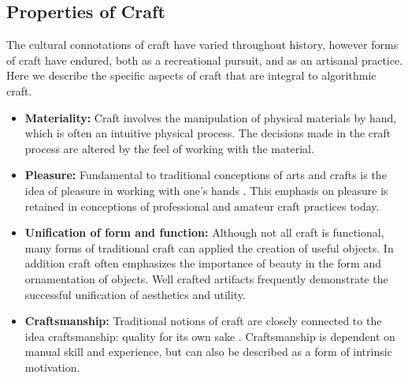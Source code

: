 \documentclass{sigchi}
\begin{document}

\subsection{Properties of Craft}
The cultural connotations of craft have varied throughout history, however forms of craft have endured, both as a recreational pursuit, and as an artisanal practice. Here we describe the specific aspects of craft that are integral to algorithmic craft.
\begin{itemize}
\item \textbf{Materiality:} Craft involves the manipulation of physical materials by hand, which is often an intuitive physical process. The decisions made in the craft process are altered by the feel of working with the material. 

\item \textbf{Pleasure:} Fundamental to traditional conceptions of arts and crafts is the idea of pleasure in working with one's hands \cite{abstracting_craft}. This emphasis on pleasure is retained in conceptions of professional and amateur craft practices today.

\item \textbf{Unification of form and function:} Although not all craft is functional, many forms of traditional craft can applied the creation of useful objects. In addition craft often emphasizes the importance of beauty in the form and ornamentation of objects. Well crafted artifacts frequently demonstrate the successful unification of aesthetics and utility.

\item \textbf{Craftsmanship:} Traditional notions of craft are closely connected to the idea craftsmanship: quality for its own sake \cite{the_craftsman}. Craftsmanship is dependent on manual skill and experience, but can also be described as a form of intrinsic motivation.
\end{itemize}
\end{document}
